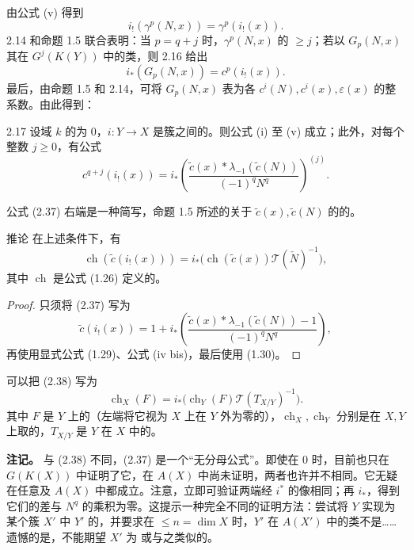 由公式 (v) 得到
\[
i_!(\gamma^p(N,x))=\gamma^p(i_!(x)).
\]
 2.14 和命题 1.5 联合表明：当 $p=q+j$ 时，$\gamma^p(N,x)$ 的 $\geq j$；若以 $G_p(N,x)$ 其在 $G^j(K(Y))$ 中的类，则 2.16 给出
\[
i_*(G_p(N,x))=c^p(i_!(x)).
\]
最后，由命题 1.5 和 2.14，可将 $G_p(N,x)$ 表为各 $c^i(N),c^i(x),\varepsilon(x)$ 的整系数。由此得到：
\begin{SGAresult}{}{2.17}
设域 $k$ 的为 $0$，$i:Y\to X$ 是簇之间的。则公式 (i) 至 (v) 成立；此外，对每个整数 $j\geq0$，有公式
\[
c^{q+j}(i_!(x))=i_*\left(\frac{\widetilde c(x)*\lambda_{-1}(\widetilde c(N))}{(-1)^qN^q}\right)^{(j)}.\tag{2.37}
\]
\end{SGAresult}
公式 (2.37) 右端是一种简写，命题 1.5 所述的关于 $\widetilde c(x),\widetilde c(N)$ 的的。
\begin{SGAresult}{推论}{}
在上述条件下，有
\[
\operatorname{ch}(\widetilde c(i_!(x)))=i_*\bigl(\operatorname{ch}(\widetilde c(x))\mathscr T(\check N)^{-1}\bigr),\tag{2.38}
\]
其中 $\operatorname{ch}$ 是公式 (1.26) 定义的。
\end{SGAresult}
\begin{proof}
只须将 (2.37) 写为
\[
\widetilde c(i_!(x))=1+i_*\left(\frac{\widetilde c(x)*\lambda_{-1}(\widetilde c(N))-1}{(-1)^qN^q}\right),\tag{2.37 bis}
\]
再使用显式公式 (1.29)、公式 (iv bis)，最后使用 (1.30)。
\end{proof}
可以把 (2.38) 写为
\[
\operatorname{ch}_X(F)=i_*\bigl(\operatorname{ch}_Y(F)\mathscr T(T_{X/Y})^{-1}\bigr).\tag{2.38 bis}
\]
其中 $F$ 是 $Y$ 上的（左端将它视为 $X$ 上在 $Y$ 外为零的），$\operatorname{ch}_X,\operatorname{ch}_Y$ 分别是在 $X,Y$ 上取的，$T_{X/Y}$ 是 $Y$ 在 $X$ 中的。

\textbf{注记。} 与 (2.38) 不同，(2.37) 是一个“无分母公式”。即使在 $0$ 时，目前也只在 $G(K(X))$ 中证明了它，在 $A(X)$ 中尚未证明，两者也许并不相同。它无疑在任意及 $A(X)$ 中都成立。注意，立即可验证两端经 $i^*$ 的像相同；再 $i_*$，得到它们的差与 $N^q$ 的乘积为零。这提示一种完全不同的证明方法：尝试将 $Y$ 实现为某个簇 $X'$ 中 $Y'$ 的，并要求在 $\leq n=\dim X$ 时，$Y'$ 在 $A(X')$ 中的类不是……遗憾的是，不能期望 $X'$ 为 或与之类似的。

